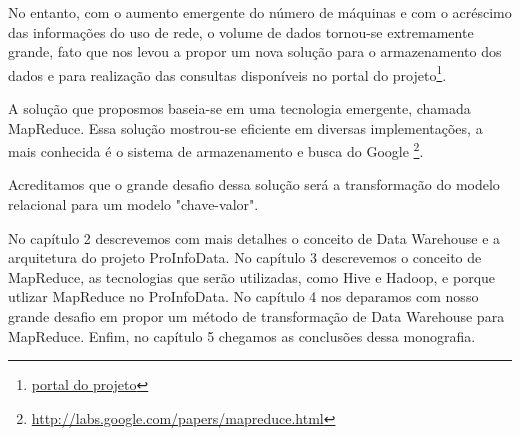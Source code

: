 No entanto, com o aumento emergente do número de máquinas e com o acréscimo das
informações do uso de rede, o volume de dados tornou-se extremamente grande, fato que 
nos levou a propor um nova solução para o armazenamento dos dados e para realização
das consultas disponíveis no portal do projeto\footnote {\href {http://seed.c3sl.ufpr.br/seed/attendance/index.html}
{portal do projeto}}.

A solução que proposmos baseia-se em uma tecnologia emergente, chamada MapReduce.
Essa solução mostrou-se eficiente em diversas implementações, a mais conhecida é
o sistema de armazenamento e busca do Google \cite{MapReduceGoogle} \footnote{\href {http://labs.google.com/papers/mapreduce.html} {http://labs.google.com/papers/mapreduce.html}}.

Acreditamos que o grande desafio dessa solução será a transformação do modelo
relacional para um modelo "chave-valor".

No capítulo 2 descrevemos com mais detalhes o conceito de Data Warehouse e a arquitetura
do projeto ProInfoData. No capítulo 3 descrevemos o conceito de MapReduce, as 
tecnologias que serão utilizadas, como Hive e Hadoop, e porque utlizar MapReduce no 
ProInfoData. No capítulo 4 nos deparamos com nosso grande desafio em propor um método de 
transformação de Data Warehouse para MapReduce. Enfim, no capítulo 5 chegamos as
conclusões dessa monografia.